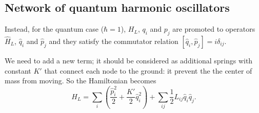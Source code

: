 \subsection{Network of quantum harmonic oscillators}

Instead, for the quantum case ($\hbar = 1$), $H_L$, $q_i$ and $p_j$ are promoted to operators $\hat H_L$, $\hat q_i$ and $\hat p_j$ and  they satisfy the commutator relation $\left[\hat q_i, \hat p_j\right] = i \delta_{ij}$.

\begin{comment}
    Since the network is undirected, $L$ is symmetric and, therefore, we can diagonalize it. The diagonalized laplacian is written in the form $\Lambda = OLO^T$.
    This generates a new set of operators respect the eigenvalue $\mu$ of the Laplacian
    \begin{equation}
    \hat q_\mu = \sum_j \hat q_\mu O_{\mu j}  \qquad \hat p_\mu= \sum_j \hat p_\mu O^T_{\mu j} .
\end{equation}
Thus,
\begin{equation}
\hat H_L = \sum_\mu \frac{\hat p_\mu^2}{2} + \frac{\mu}{2}\hat q_\mu^2,
\end{equation}

We introduce the bosons creation and annihilation operators as
\begin{equation}
     \hat a_\mu = \frac{1}{\sqrt{2}}\left(\sqrt{\omega} \hat q_\mu + \frac{i}{\sqrt{\omega}}\hat p_\mu\right) \qquad 
     \hat a_\mu^\dagger = \frac{1}{\sqrt{2}}\left(\sqrt{\omega} \hat q_\mu - \frac{i}{\sqrt{\omega}}\hat p_\mu\right), 
\end{equation}      
and the inverse is
\begin{equation}
    \hat q_\mu = \sqrt{\frac{1}{2\omega}}\left(\hat a_\mu + \hat a_\mu^\dagger\right) \qquad
    \hat p_\mu = i\sqrt{\frac{\omega}{2}}\left(\hat a_\mu - \hat a_\mu^\dagger\right) \qquad,
\end{equation}
where $\omega = \sqrt{\mu}$.
They satisfy the commutation relation $\left[\hat a_i, \hat a^\dagger_j\right] = \delta_{ij}$.

Thus, the new Hamiltonian becomes a sum of independent Hamiltonians for each mode
\begin{equation}
\hat H_L = \sum_\mu \hat H_\mu, \qquad
\hat H_\mu = \omega \left(\hat a_\mu \hat a^\dagger_\mu + \frac{1}{2}\right).
\end{equation}
\end{comment}

We need to add a new term; it should be considered as additional springs with constant $K'$ that connect each node to the ground: it prevent the the center of mass from moving. So the Hamiltonian becomes
\begin{equation}\label{H_L_QM}
    H_L = \sum_i\left(\frac{\hat p_i^2}{2}+\frac{K'}{2}\hat q_i^2\right) + \sum_{ij}\frac{1}{2} L_{ij}\hat q_i\hat q_j.
\end{equation}

